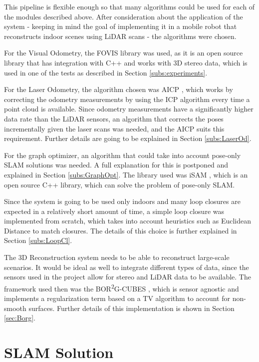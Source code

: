 \documentclass[11pt]{article}
\begin{document}
This pipeline is flexible enough so that many algorithms could be used for each of the modules described above. After consideration about the application of the system - keeping in mind the goal of implementing it in a mobile robot that reconstructs indoor scenes using LiDAR scans - the algorithms were chosen.
	
For the Visual Odometry, the FOVIS library \cite{fovis} was used, as it is an open source library that has integration with C++ and works with 3D stereo data, which is used in one of the tests as described in Section \ref{subs:experiments}.
	
For the Laser Odometry, the algorithm chosen was AICP \cite{7989547}, which works by correcting the odometry measurements by using the ICP algorithm every time a point cloud is available. Since odometry measurements have a significantly higher data rate than the LiDAR sensors, an algorithm that corrects the poses incrementally given the laser scans was needed, and the AICP suits this requirement. Further details are going to be explained in Section \ref{subs:LaserOd}.
	
For the graph optimizer, an algorithm that could take into account pose-only SLAM solutions was needed. A full explanation for this is postponed and explained in Section \ref{subs:GraphOpt}. The library used was iSAM \cite{Kaess08tro}, which is an open source C++ library, which can solve the problem of pose-only SLAM.
	
Since the system is going to be used only indoors and many loop closures are expected in a relatively short amount of time, a simple loop closure was implemented from scratch, which takes into account heuristics such as Euclidean Distance to match closures. The details of this choice is further explained in Section \ref{subs:LoopCl}.
	
The 3D Reconstruction system needs to be able to reconstruct large-scale scenarios. It would be ideal as well to integrate different types of data, since the sensors used in the project allow for stereo and LiDAR data to be available. The framework used then was the BOR\textsuperscript{2}G-CUBES \cite{TannerFSR2015}\cite{TannerArXiv2016}, which is sensor agnostic and implements a regularization term based on a TV algorithm to account for non-smooth surfaces. Further details of this implementation is shown in Section \ref{sec:Borg}.
		
	\newpage
	\section{SLAM Solution}
\end{document}
